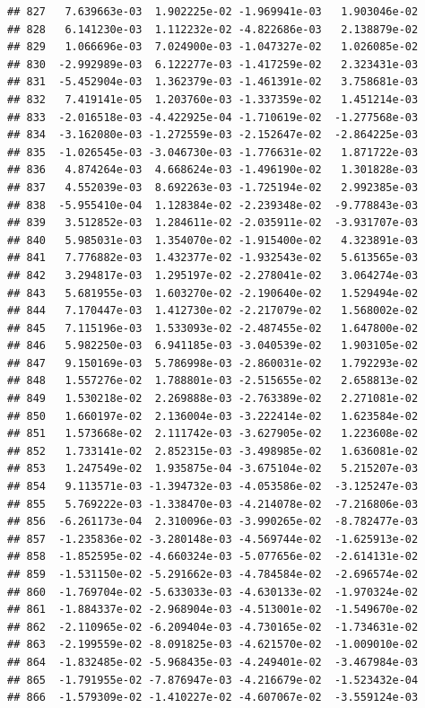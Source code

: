 \documentclass[
]{article}
\begin{document}
\begin{verbatim}
## 827   7.639663e-03  1.902225e-02 -1.969941e-03   1.903046e-02
## 828   6.141230e-03  1.112232e-02 -4.822686e-03   2.138879e-02
## 829   1.066696e-03  7.024900e-03 -1.047327e-02   1.026085e-02
## 830  -2.992989e-03  6.122277e-03 -1.417259e-02   2.323431e-03
## 831  -5.452904e-03  1.362379e-03 -1.461391e-02   3.758681e-03
## 832   7.419141e-05  1.203760e-03 -1.337359e-02   1.451214e-03
## 833  -2.016518e-03 -4.422925e-04 -1.710619e-02  -1.277568e-03
## 834  -3.162080e-03 -1.272559e-03 -2.152647e-02  -2.864225e-03
## 835  -1.026545e-03 -3.046730e-03 -1.776631e-02   1.871722e-03
## 836   4.874264e-03  4.668624e-03 -1.496190e-02   1.301828e-03
## 837   4.552039e-03  8.692263e-03 -1.725194e-02   2.992385e-03
## 838  -5.955410e-04  1.128384e-02 -2.239348e-02  -9.778843e-03
## 839   3.512852e-03  1.284611e-02 -2.035911e-02  -3.931707e-03
## 840   5.985031e-03  1.354070e-02 -1.915400e-02   4.323891e-03
## 841   7.776882e-03  1.432377e-02 -1.932543e-02   5.613565e-03
## 842   3.294817e-03  1.295197e-02 -2.278041e-02   3.064274e-03
## 843   5.681955e-03  1.603270e-02 -2.190640e-02   1.529494e-02
## 844   7.170447e-03  1.412730e-02 -2.217079e-02   1.568002e-02
## 845   7.115196e-03  1.533093e-02 -2.487455e-02   1.647800e-02
## 846   5.982250e-03  6.941185e-03 -3.040539e-02   1.903105e-02
## 847   9.150169e-03  5.786998e-03 -2.860031e-02   1.792293e-02
## 848   1.557276e-02  1.788801e-03 -2.515655e-02   2.658813e-02
## 849   1.530218e-02  2.269888e-03 -2.763389e-02   2.271081e-02
## 850   1.660197e-02  2.136004e-03 -3.222414e-02   1.623584e-02
## 851   1.573668e-02  2.111742e-03 -3.627905e-02   1.223608e-02
## 852   1.733141e-02  2.852315e-03 -3.498985e-02   1.636081e-02
## 853   1.247549e-02  1.935875e-04 -3.675104e-02   5.215207e-03
## 854   9.113571e-03 -1.394732e-03 -4.053586e-02  -3.125247e-03
## 855   5.769222e-03 -1.338470e-03 -4.214078e-02  -7.216806e-03
## 856  -6.261173e-04  2.310096e-03 -3.990265e-02  -8.782477e-03
## 857  -1.235836e-02 -3.280148e-03 -4.569744e-02  -1.625913e-02
## 858  -1.852595e-02 -4.660324e-03 -5.077656e-02  -2.614131e-02
## 859  -1.531150e-02 -5.291662e-03 -4.784584e-02  -2.696574e-02
## 860  -1.769704e-02 -5.633033e-03 -4.630133e-02  -1.970324e-02
## 861  -1.884337e-02 -2.968904e-03 -4.513001e-02  -1.549670e-02
## 862  -2.110965e-02 -6.209404e-03 -4.730165e-02  -1.734631e-02
## 863  -2.199559e-02 -8.091825e-03 -4.621570e-02  -1.009010e-02
## 864  -1.832485e-02 -5.968435e-03 -4.249401e-02  -3.467984e-03
## 865  -1.791955e-02 -7.876947e-03 -4.216679e-02  -1.523432e-04
## 866  -1.579309e-02 -1.410227e-02 -4.607067e-02  -3.559124e-03

\end{verbatim}
\end{document}
